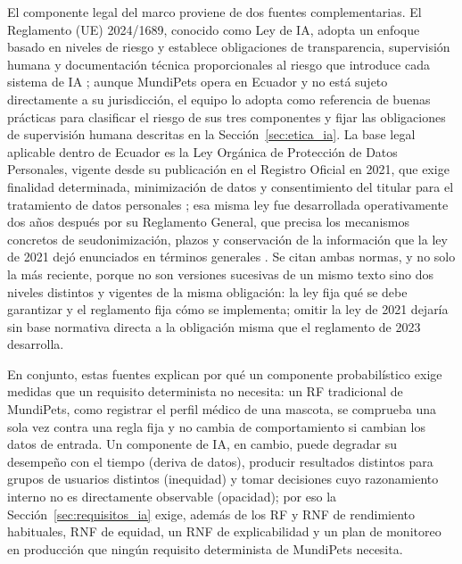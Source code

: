 \documentclass[journal,onecolumn]{IEEEtran}
\begin{document}
	El componente legal del marco proviene de dos fuentes complementarias. El Reglamento (UE)
	2024/1689, conocido como Ley de IA, adopta un enfoque basado en niveles de riesgo y establece
	obligaciones de transparencia, supervisión humana y documentación técnica proporcionales al
	riesgo que introduce cada sistema de IA \cite{euaiact2024}; aunque MundiPets opera en Ecuador y
	no está sujeto directamente a su jurisdicción, el equipo lo adopta como referencia de buenas
	prácticas para clasificar el riesgo de sus tres componentes y fijar las obligaciones de
	supervisión humana descritas en la Sección~\ref{sec:etica_ia}. La base legal aplicable dentro
	de Ecuador es la Ley Orgánica de Protección de Datos Personales, vigente desde su publicación
	en el Registro Oficial en 2021, que exige finalidad determinada, minimización de datos y
	consentimiento del titular para el tratamiento de datos personales \cite{lopdp2021}; esa misma
	ley fue desarrollada operativamente dos años después por su Reglamento General, que precisa los
	mecanismos concretos de seudonimización, plazos y conservación de la información que la ley de
	2021 dejó enunciados en términos generales \cite{lopdp_reglamento2023}. Se citan ambas normas,
	y no solo la más reciente, porque no son versiones sucesivas de un mismo texto sino dos niveles
	distintos y vigentes de la misma obligación: la ley fija qué se debe garantizar y el reglamento
	fija cómo se implementa; omitir la ley de 2021 dejaría sin base normativa directa a la
	obligación misma que el reglamento de 2023 desarrolla.

	En conjunto, estas fuentes explican por qué un componente probabilístico exige medidas que un
	requisito determinista no necesita: un RF tradicional de MundiPets, como registrar el perfil
	médico de una mascota, se comprueba una sola vez contra una regla fija y no cambia de
	comportamiento si cambian los datos de entrada. Un componente de IA, en cambio, puede degradar
	su desempeño con el tiempo (deriva de datos), producir resultados distintos para grupos de
	usuarios distintos (inequidad) y tomar decisiones cuyo razonamiento interno no es directamente
	observable (opacidad); por eso la Sección~\ref{sec:requisitos_ia} exige, además de los RF y RNF
	de rendimiento habituales, RNF de equidad, un RNF de explicabilidad y un plan de monitoreo en
	producción que ningún requisito determinista de MundiPets necesita.
	

	\printbibliography[title={Referencias}]
	

	
\end{document}
